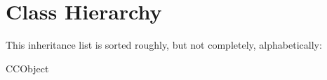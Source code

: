 \section{Class Hierarchy}
This inheritance list is sorted roughly, but not completely, alphabetically\-:\begin{DoxyCompactList}
\item C\-C\-Object\begin{DoxyCompactList}
\item {}
\item {}
\end{DoxyCompactList}
\item {}
\end{DoxyCompactList}
